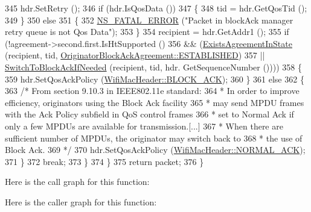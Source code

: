 \begin{DoxyCode}
345           hdr.SetRetry ();
346           \textcolor{keywordflow}{if} (hdr.IsQosData ())
347             \{
348               tid = hdr.GetQosTid ();
349             \}
350           \textcolor{keywordflow}{else}
351             \{
352               \hyperlink{group__fatal_ga5131d5e3f75d7d4cbfd706ac456fdc85}{NS\_FATAL\_ERROR} (\textcolor{stringliteral}{"Packet in blockAck manager retry queue is not Qos Data"});
353             \}
354           recipient = hdr.GetAddr1 ();
355           \textcolor{keywordflow}{if} (!agreement->second.first.IsHtSupported ()
356               && (\hyperlink{classns3_1_1BlockAckManager_ae13c4678f75ebfda7f63d0521878662b}{ExistsAgreementInState} (recipient, tid, 
      \hyperlink{classns3_1_1OriginatorBlockAckAgreement_ab33ae8af8c458aca7437a472778e4761a341f78e1e094b88dea42e94b32871067}{OriginatorBlockAckAgreement::ESTABLISHED})
357                   || \hyperlink{classns3_1_1BlockAckManager_a20324b49d01312f731087f7f707a596a}{SwitchToBlockAckIfNeeded} (recipient, tid, hdr.
      GetSequenceNumber ())))
358             \{
359               hdr.SetQosAckPolicy (\hyperlink{classns3_1_1WifiMacHeader_ae3a382482f357972019f5e1b3162adc4a8d2763ea0083f1265fbf7dda6fdcf9fd}{WifiMacHeader::BLOCK\_ACK});
360             \}
361           \textcolor{keywordflow}{else}
362             \{
363               \textcolor{comment}{/* From section 9.10.3 in IEEE802.11e standard:}
364 \textcolor{comment}{               * In order to improve efficiency, originators using the Block Ack facility}
365 \textcolor{comment}{               * may send MPDU frames with the Ack Policy subfield in QoS control frames}
366 \textcolor{comment}{               * set to Normal Ack if only a few MPDUs are available for transmission.[...]}
367 \textcolor{comment}{               * When there are sufficient number of MPDUs, the originator may switch back to}
368 \textcolor{comment}{               * the use of Block Ack.}
369 \textcolor{comment}{               */}
370               hdr.SetQosAckPolicy (\hyperlink{classns3_1_1WifiMacHeader_ae3a382482f357972019f5e1b3162adc4a9f52b9c6ca65d046ce2be9d70bce28cf}{WifiMacHeader::NORMAL\_ACK});
371             \}
372           \textcolor{keywordflow}{break};
373         \}
374     \}
375   \textcolor{keywordflow}{return} packet;
376 \}
\end{DoxyCode}


Here is the call graph for this function\+:




Here is the caller graph for this function\+:


